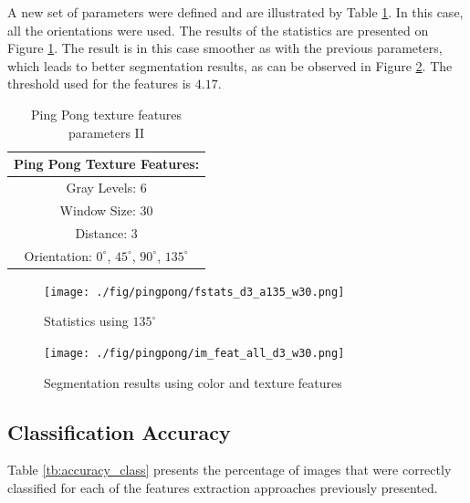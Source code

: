 \documentclass{IEEEtran}
\begin{document}

A new set of parameters were defined and are illustrated by Table \ref{tb:param_pingpong2}. In this case, all the orientations were used. The results of the statistics are presented on Figure \ref{fig:pingpong_135_2}. The result is in this case smoother as with the previous parameters, which leads to better segmentation results, as can be observed in Figure \ref{fig:pingpong_seg_2}. The threshold used for the features is $4.17$.

\begin{table}[h!] 
\centering
\begin{tabular}{|c|}
\hline
Ping Pong Texture Features:\\
\hline
  Gray Levels:   6\\
  Window Size: 30\\
  Distance:   3\\
  Orientation:  $0^{\circ}$, $45^{\circ}$, $90^{\circ}$, $135^{\circ}$\\
\hline
\end{tabular}
\caption{Ping Pong texture features parameters II}
\label{tb:param_pingpong2}
\end{table}

\begin{figure}[h!] 
 \centering
 \texttt{[image: ./fig/pingpong/fstats\_d3\_a135\_w30.png]}%
 \caption{Statistics using $135^{\circ}$}
 \label{fig:pingpong_135_2}
\end{figure}


\begin{figure}[h!] 
 \centering
 \texttt{[image: ./fig/pingpong/im\_feat\_all\_d3\_w30.png]}%
 \caption{Segmentation results using color and texture features}
 \label{fig:pingpong_seg_2}
\end{figure}


\subsection{Classification Accuracy}

Table \ref{tb:accuracy_class} presents the percentage of images that were correctly classified for each of the features extraction approaches previously presented.\\

\end{document}
